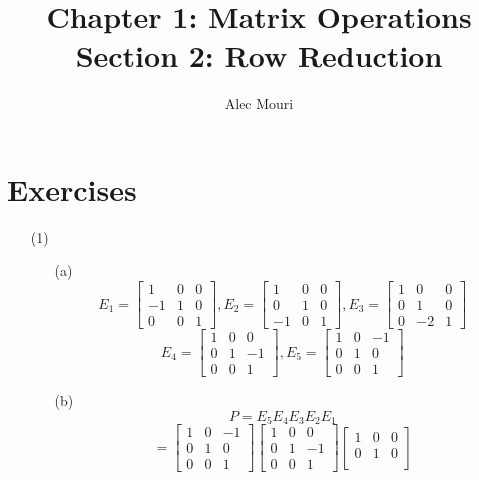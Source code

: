 \documentclass[12pt]{article}
\begin{document}
\title{Chapter 1: Matrix Operations \\ Section 2: Row Reduction}
\author{Alec Mouri}

\maketitle
\section*{Exercises}
\begin{itemize}
\item[(1)]
\begin{itemize}
\item[(a)]
$$E_1 = \begin{bmatrix}
1 & 0 & 0 \\
-1 & 1 & 0 \\
0 & 0 & 1
\end{bmatrix}, E_2 = \begin{bmatrix}
1 & 0 & 0 \\
0 & 1 & 0 \\
-1 & 0 & 1
\end{bmatrix}, E_3 = \begin{bmatrix}
1 & 0 & 0 \\
0 & 1 & 0 \\
0 & -2 & 1
\end{bmatrix}$$
$$E_4 = \begin{bmatrix}
1 & 0 & 0 \\
0 & 1 & -1 \\
0 & 0 & 1
\end{bmatrix}, E_5 = \begin{bmatrix}
1 & 0 & -1 \\
0 & 1 & 0 \\
0 & 0 & 1
\end{bmatrix}$$
\item[(b)]
$$P = E_5E_4E_3E_2E_1$$
$$= \begin{bmatrix}
1 & 0 & -1 \\
0 & 1 & 0 \\
0 & 0 & 1
\end{bmatrix}\begin{bmatrix}
1 & 0 & 0 \\
0 & 1 & -1 \\
0 & 0 & 1
\end{bmatrix}\begin{bmatrix}
1 & 0 & 0 \\
0 & 1 & 0 \\

\end{bmatrix}$$
\end{itemize}
\end{itemize}
\end{document}
